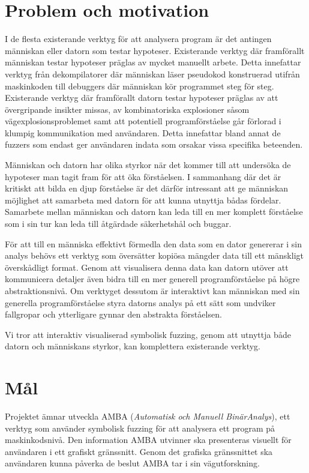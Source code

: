 \section{Problem och motivation}

I de flesta existerande verktyg för att analysera program är det antingen
människan eller datorn som testar hypoteser. Existerande verktyg där
framförallt människan testar hypoteser präglas av mycket manuellt arbete. Detta
innefattar verktyg från dekompilatorer där människan läser pseudokod konstruerad
utifrån maskinkoden till debuggers där människan kör programmet steg för steg.
Existerande verktyg där framförallt datorn testar hypoteser präglas av att
övergripande insikter missas, av kombinatoriska explosioner såsom
vägexplosionsproblemet samt att potentiell programförståelse går förlorad i
klumpig kommunikation med användaren. Detta innefattar bland annat de fuzzers
som endast ger användaren indata som orsakar vissa specifika beteenden.

Människan och datorn har olika styrkor när det kommer till att undersöka de
hypoteser man tagit fram för att öka förståelsen. I sammanhang där det är
kritiskt att bilda en djup förståelse är det därför intressant att ge människan
möjlighet att samarbeta med datorn för att kunna utnyttja bådas fördelar.
Samarbete mellan människan och datorn kan leda till en mer komplett förståelse
som i sin tur kan leda till åtgärdade säkerhetshål och buggar.

För att till en människa effektivt förmedla den data som en dator genererar i
sin analys behövs ett verktyg som översätter kopiösa mängder data till ett
mänskligt överskådligt format. Genom att visualisera denna data kan datorn
utöver att kommunicera detaljer även bidra till en mer generell
programförståelse på högre abstraktionsnivå. Om verktyget dessutom är
interaktivt kan människan med sin generella programförståelse styra datorns
analys på ett sätt som undviker fallgropar och ytterligare gynnar den abstrakta
förståelsen.

Vi tror att interaktiv visualiserad symbolisk fuzzing, genom att utnyttja både
datorn och människans styrkor, kan komplettera existerande verktyg.

\section{Mål}\label{sec:mal}

Projektet ämnar utveckla AMBA (\emph{Automatisk och Manuell BinärAnalys}), ett
verktyg som använder symbolisk fuzzing för att analysera ett program på
maskinkodsnivå. Den information AMBA utvinner ska presenteras visuellt för
användaren i ett grafiskt gränssnitt. Genom det grafiska gränssnittet ska
användaren kunna påverka de beslut AMBA tar i sin vägutforskning.

